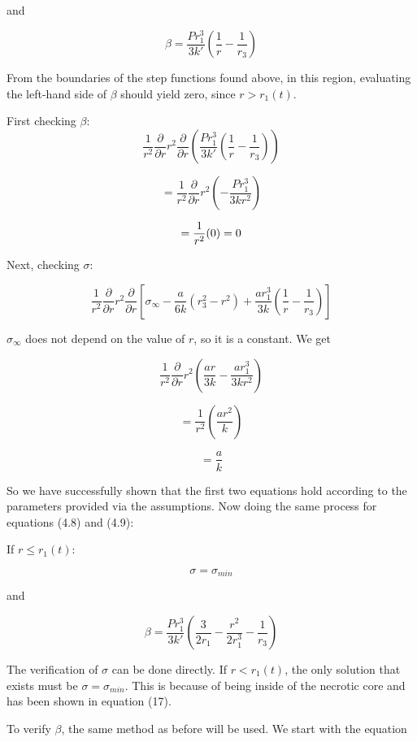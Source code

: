 \documentclass{article}
\begin{document}
and

\begin{equation}
    \beta = \frac{Pr_1^3}{3k'}(\frac{1}{r} - \frac{1}{r_3})
\end{equation}

From the boundaries of the step functions found above, in this region, evaluating the left-hand side of $\beta$ should
yield zero, since $r > r_1(t)$.

First checking $\beta$:
$$
    \frac{1}{r^2} \frac{\partial}{\partial r} r^2 \frac{\partial}{\partial r} (\frac{Pr_1^3}{3k'}(\frac{1}{r} - \frac{1}{r_3}))
$$

$$
    = \frac{1}{r^2} \frac{\partial}{\partial r} r^2 (-\frac{Pr_1^3}{3kr^2})
$$

$$
    = \frac{1}{r^2} (\* 0) = 0
$$

Next, checking $\sigma$:

$$
    \frac{1}{r^2} \frac{\partial}{\partial r} r^2 \frac{\partial}{\partial r} [\sigma_{\infty} - \frac{a}{6k}(r_3^2 - r^2) + \frac{ar_1^3}{3k} (\frac{1}{r} - \frac{1}{r_3})]
$$


$\sigma_{\infty}$ does not depend on the value of $r$, so it is a constant. We get

$$
    \frac{1}{r^2} \frac{\partial}{\partial r} r^2 (\frac{ar}{3k} - \frac{ar_1^3}{3kr^2})
$$

$$
    = \frac{1}{r^2} (\frac{ar^2}{k})
$$

$$
    = \frac{a}{k}
$$

So we have successfully shown that the first two equations hold according to the parameters provided via the assumptions.
Now doing the same process for equations (4.8) and (4.9):

If $ r \leq r_1(t)$:

\begin{equation}
    \sigma = \sigma_{min}
\end{equation}

and

\begin{equation}
    \beta = \frac{Pr_1^3}{3k'}(\frac{3}{2r_1} - \frac{r^2}{2r_1^3} - \frac{1}{r_3})
\end{equation}

The verification of $\sigma$ can be done directly. If $r < r_1(t)$, the only solution that exists must be $\sigma = \sigma_{min}$.
This is because of being inside of the necrotic core and has been shown in equation (17).

To verify $\beta$, the same method as before will be used. We start with the equation
\end{document}
